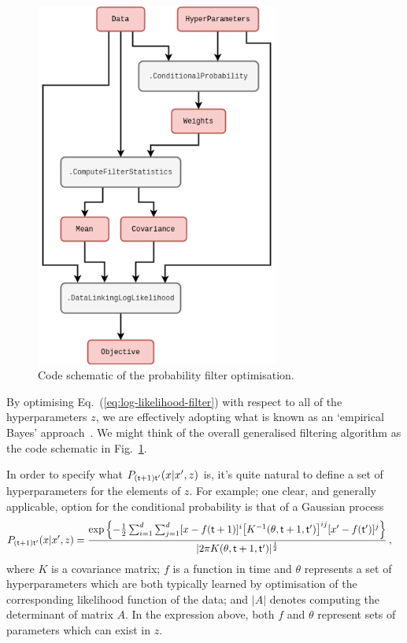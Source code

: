 \begin{figure}[h]
\centering
\includegraphics[width=8cm]{images/chapter-4-prob-filter-code.drawio.png}
\caption{Code schematic of the probability filter optimisation.}
\label{fig:prob-filter-code}
\end{figure} 

By optimising Eq.~(\ref{eq:log-likelihood-filter}) with respect to all of the hyperparameters $z$, we are effectively adopting what is known as an `empirical Bayes' approach~\cite{murphy2012machine, mackay2003information}. We might think of the overall generalised filtering algorithm as the code schematic in Fig.~\ref{fig:prob-filter-code}.

In order to specify what $P_{({\sf t}+1){\sf t}'}(x\vert x',z)$ is, it's quite natural to define a set of hyperparameters for the elements of $z$. For example; one clear, and generally applicable, option for the conditional probability is that of a Gaussian process 
\begin{align}
P_{({\sf t}+1){\sf t}'}(x\vert x',z) &= \frac{{\rm exp}\left\{ -\frac{1}{2}\sum^d_{i=1}\sum^d_{j=1}[x-f({\sf t}+1)]^i \big[ K^{-1}(\theta , {\sf t}+1,{\sf t}')\big]^{ij}[x'-f({\sf t}')]^j  \right\}}{\vert 2\pi K(\theta , {\sf t}+1,{\sf t}') \vert^{\frac{1}{2}}} \label{eq:gaussian-process-cond-prob}\,,
\end{align}
where $K$ is a covariance matrix; $f$ is a function in time and $\theta$ represents a set of hyperparameters which are both typically learned by optimisation of the corresponding likelihood function of the data; and $\vert A\vert$ denotes computing the determinant of matrix $A$. In the expression above, both $f$ and $\theta$ represent sets of parameters which can exist in $z$.


